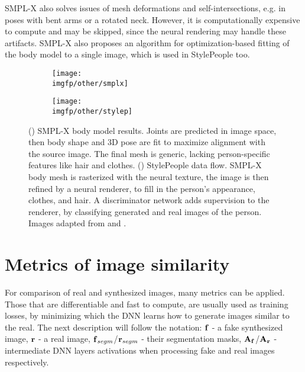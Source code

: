SMPL-X also solves issues of mesh deformations and self-intersections, e.g. in poses with bent arms or a rotated neck. However, it is computationally expensive to compute and may be skipped, since the neural rendering may handle these artifacts. SMPL-X also proposes an algorithm for optimization-based fitting of the body model to a single image, which is used in StylePeople too. 

\begin{figure}[h!]
	\setlength\abovedisplayskip{0pt}
	\centering
	\begin{subfigure}[b]{0.39\textwidth}
		\centering
		\texttt{[image: \\imgfp/other/smplx]}
		\caption{}
		\label{lit:fig:smplx}
	\end{subfigure}
	\hfill
	\begin{subfigure}[b]{0.60\textwidth}
		\centering
		\texttt{[image: \\imgfp/other/stylep]}
		\caption{}
		\label{lit:fig:stylepeople}
	\end{subfigure}
	\label{lit:fig:avatars}
	\vspace*{-2em}
	\caption{(\protect{}) SMPL-X body model results. Joints are predicted in image space, then body shape and 3D pose are fit to maximize alignment with the source image. The final mesh is generic, lacking person-specific features like hair and clothes. (\protect{}) StylePeople data flow. SMPL-X body mesh is rasterized with the neural texture, the image is then refined by a neural renderer, to fill in the person's appearance, clothes, and hair. A discriminator network adds supervision to the renderer, by classifying generated and real images of the person. Images adapted from \cite{dnn:smplx19} and \cite{dnn:stylepeople21}.}
	\setlength\belowdisplayskip{0pt}
\end{figure}
\vspace*{-2em}
\section{Metrics of image similarity}
\label{lit:metrics}

For comparison of real and synthesized images, many metrics can be applied. Those that are differentiable and fast to compute, are usually used as training losses, by minimizing which the DNN learns how to generate images similar to the real. The next description will follow the notation: $\bm{\mathrm{f}}$ - a fake synthesized image, $\bm{\mathrm{r}}$ - a real image, $\bm{\mathrm{f}}_{segm}$/$\bm{\mathrm{r}}_{segm}$ - their segmentation masks, $\bm{\mathrm{A_f}}$/$\bm{\mathrm{A_r}}$ - intermediate DNN layers activations when processing fake and real images respectively.

